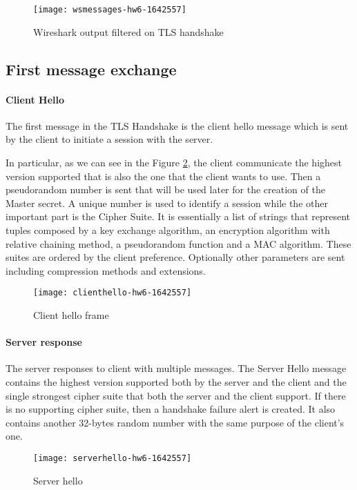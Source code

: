 \documentclass[11pt]{article}
\begin{document}
\begin{figure}[h]
\texttt{[image: wsmessages-hw6-1642557]}
\centering
\caption{Wireshark output filtered on TLS handshake}
\label{fig:wsmessages}
\end{figure}

\subsection*{First message exchange}
\paragraph*{Client Hello}
The first message in the TLS Handshake is the client hello message which is sent by the client to initiate a session with the server.

In particular, as we can see in the Figure \ref{fig:clienthello}, the client communicate the highest version supported that is also the one that the client wants to use. Then a pseudorandom number is sent that will be used later for the creation of the Master secret. A unique number is used to identify a session while the other important part is the Cipher Suite. It is essentially a list of strings that represent tuples composed by a key exchange algorithm, an encryption algorithm with relative chaining method, a pseudorandom function and a MAC algorithm. These suites are ordered by the client preference. Optionally other parameters are sent including compression methods and extensions.

\begin{figure}[h]
\texttt{[image: clienthello-hw6-1642557]}
\centering
\caption{Client hello frame}
\label{fig:clienthello}
\end{figure}

\paragraph*{Server response}
The server responses to client with multiple messages. The Server Hello message contains the highest version supported both by the server and the client and the single strongest cipher suite that both the server and the client support. If there is no supporting cipher suite, then a handshake failure alert is created. It also contains another 32-bytes random number with the same purpose of the client's one.

\begin{figure}[h]
\texttt{[image: serverhello-hw6-1642557]}
\centering
\caption{Server hello}
\label{fig:serverhello}
\end{figure}
\end{document}
